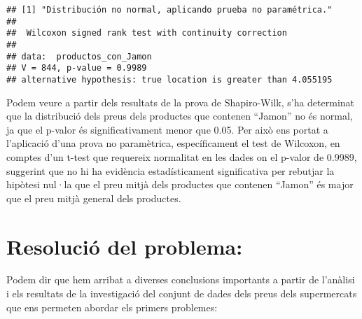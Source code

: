 \documentclass[
]{article}
\newenvironment{Shaded}{\begin{snugshade}}{\end{snugshade}}
\newcommand{\AttributeTok}[1]{\textcolor[rgb]{0.13,0.29,0.53}{#1}}
\newcommand{\CommentTok}[1]{\textcolor[rgb]{0.56,0.35,0.01}{\textit{#1}}}
\newcommand{\ControlFlowTok}[1]{\textcolor[rgb]{0.13,0.29,0.53}{\textbf{#1}}}
\newcommand{\FloatTok}[1]{\textcolor[rgb]{0.00,0.00,0.81}{#1}}
\newcommand{\FunctionTok}[1]{\textcolor[rgb]{0.13,0.29,0.53}{\textbf{#1}}}
\newcommand{\NormalTok}[1]{#1}
\newcommand{\OtherTok}[1]{\textcolor[rgb]{0.56,0.35,0.01}{#1}}
\newcommand{\SpecialCharTok}[1]{\textcolor[rgb]{0.81,0.36,0.00}{\textbf{#1}}}
\newcommand{\StringTok}[1]{\textcolor[rgb]{0.31,0.60,0.02}{#1}}
\begin{document}
\begin{Shaded}
\end{Shaded}

\begin{verbatim}
## [1] "Distribución no normal, aplicando prueba no paramétrica."
## 
##  Wilcoxon signed rank test with continuity correction
## 
## data:  productos_con_Jamon
## V = 844, p-value = 0.9989
## alternative hypothesis: true location is greater than 4.055195
\end{verbatim}

Podem veure a partir dels resultats de la prova de Shapiro-Wilk, s'ha
determinat que la distribució dels preus dels productes que contenen
``Jamon'' no és normal, ja que el p-valor és significativament menor que
0.05. Per això ens portat a l'aplicació d'una prova no paramètrica,
específicament el test de Wilcoxon, en comptes d'un t-test que requereix
normalitat en les dades on el p-valor de 0.9989, suggerint que no hi ha
evidència estadísticament significativa per rebutjar la hipòtesi nul·la
que el preu mitjà dels productes que contenen ``Jamon'' és major que el
preu mitjà general dels productes.

\hypertarget{resoluciuxf3-del-problema}{%
\section{Resolució del problema:}\label{resoluciuxf3-del-problema}}

Podem dir que hem arribat a diverses conclusions importants a partir de
l'anàlisi i els resultats de la investigació del conjunt de dades dels
preus dels supermercats que ens permeten abordar els primers problemes:
\end{document}
